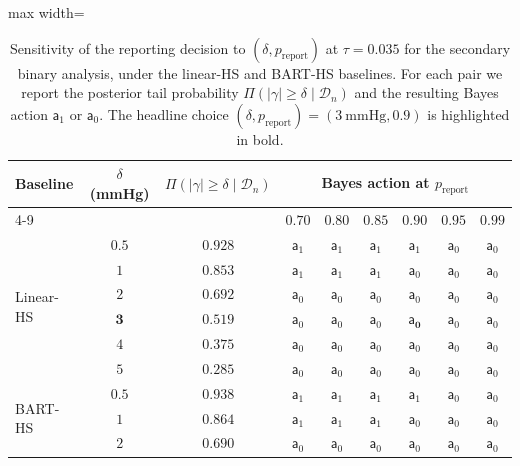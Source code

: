 \documentclass[11pt]{article}
\theoremstyle{definition}
\theoremstyle{plain}
\begin{document}
\begin{table}[!htbp]
  \centering
  \caption{Sensitivity of the reporting decision to $(\delta, p_{\mathrm{report}})$ at $\tau=0.035$ for the secondary binary analysis, under the linear-HS and BART-HS baselines. For each pair we report the posterior tail probability $\Pi(|\gamma|\ge\delta\mid\mathcal D_n)$ and the resulting Bayes action $\mathsf{a}_1$ or $\mathsf{a}_0$. The headline choice $(\delta,p_{\mathrm{report}})=(3~\mathrm{mmHg},0.9)$ is highlighted in bold.}
  \label{tab:sensitivity_delta_p}
  \small
  \begin{adjustbox}{max width=\textwidth}
  \begin{tabular}{l c c *{6}{c}}
    \toprule
    Baseline & $\delta$ (mmHg) & $\Pi(|\gamma|\ge\delta\mid\mathcal D_n)$ & \multicolumn{6}{c}{Bayes action at $p_{\mathrm{report}}$} \\
    \cmidrule(lr){4-9}
     &  &  & $0.70$ & $0.80$ & $0.85$ & $\boldsymbol{0.90}$ & $0.95$ & $0.99$ \\
    \midrule
    \multirow{6}{*}{Linear-HS}
      & $0.5$ & $0.928$ & $\mathsf{a}_1$ & $\mathsf{a}_1$ & $\mathsf{a}_1$ & $\mathsf{a}_1$ & $\mathsf{a}_0$ & $\mathsf{a}_0$ \\
      & $1$ & $0.853$ & $\mathsf{a}_1$ & $\mathsf{a}_1$ & $\mathsf{a}_1$ & $\mathsf{a}_0$ & $\mathsf{a}_0$ & $\mathsf{a}_0$ \\
      & $2$ & $0.692$ & $\mathsf{a}_0$ & $\mathsf{a}_0$ & $\mathsf{a}_0$ & $\mathsf{a}_0$ & $\mathsf{a}_0$ & $\mathsf{a}_0$ \\
      & $\boldsymbol{3}$ & $0.519$ & $\mathsf{a}_0$ & $\mathsf{a}_0$ & $\mathsf{a}_0$ & $\boldsymbol{\mathsf{a}_0}$ & $\mathsf{a}_0$ & $\mathsf{a}_0$ \\
      & $4$ & $0.375$ & $\mathsf{a}_0$ & $\mathsf{a}_0$ & $\mathsf{a}_0$ & $\mathsf{a}_0$ & $\mathsf{a}_0$ & $\mathsf{a}_0$ \\
      & $5$ & $0.285$ & $\mathsf{a}_0$ & $\mathsf{a}_0$ & $\mathsf{a}_0$ & $\mathsf{a}_0$ & $\mathsf{a}_0$ & $\mathsf{a}_0$ \\
    \midrule
    \multirow{6}{*}{BART-HS}
      & $0.5$ & $0.938$ & $\mathsf{a}_1$ & $\mathsf{a}_1$ & $\mathsf{a}_1$ & $\mathsf{a}_1$ & $\mathsf{a}_0$ & $\mathsf{a}_0$ \\
      & $1$ & $0.864$ & $\mathsf{a}_1$ & $\mathsf{a}_1$ & $\mathsf{a}_1$ & $\mathsf{a}_0$ & $\mathsf{a}_0$ & $\mathsf{a}_0$ \\
      & $2$ & $0.690$ & $\mathsf{a}_0$ & $\mathsf{a}_0$ & $\mathsf{a}_0$ & $\mathsf{a}_0$ & $\mathsf{a}_0$ & $\mathsf{a}_0$ \\

\end{tabular}
\end{adjustbox}
\end{table}
\end{document}
